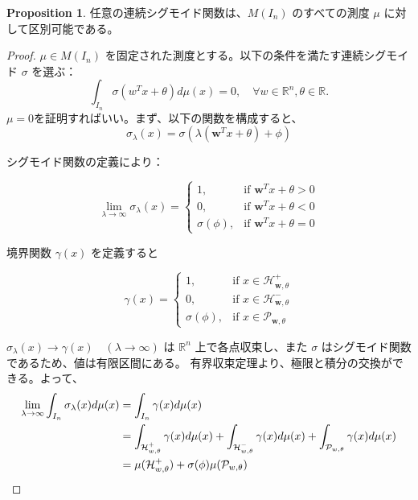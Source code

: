 \documentclass[a4paper]{jsarticle}
\theoremstyle{definition}
\newtheorem{prop}[dfn]{Proposition}
\begin{document}
\begin{prop}
任意の連続シグモイド関数は、$M(I_n)$ のすべての測度 $\mu$ に対して区別可能である。


\begin{proof}
$\mu \in M(I_n)$ を固定された測度とする。以下の条件を満たす連続シグモイド $\sigma$ を選ぶ：
\begin{equation}
  \int_{I_n} \sigma(w^T x + \theta)d\mu(x) = 0, \quad \forall w \in \mathbb{R}^n, \theta \in \mathbb{R}.\label{eq2}
\end{equation}
$\mu=0$を証明すればいい。まず、以下の関数を構成すると、
\[
\sigma_\lambda(x) = \sigma(\lambda(\mathbf{w}^T x + \theta) + \phi)
\]

シグモイド関数の定義により：

\[
\lim_{\lambda \to \infty} \sigma_\lambda(x) = \begin{cases} 
1, & \text{if } \mathbf{w}^T x + \theta > 0 \\
0, & \text{if } \mathbf{w}^T x + \theta < 0 \\
\sigma(\phi), & \text{if } \mathbf{w}^T x + \theta = 0
\end{cases}
\]

境界関数 $\gamma(x)$ を定義すると

\[
\gamma(x) = \begin{cases} 
1, & \text{if } x \in \mathcal{H}^+_{\mathbf{w},\theta} \\
0, & \text{if } x \in \mathcal{H}^-_{\mathbf{w},\theta} \\
\sigma(\phi), & \text{if } x \in \mathcal{P}_{\mathbf{w},\theta}
\end{cases}
\]

$\sigma_\lambda(x) \to \gamma(x)\quad (\lambda\to\infty)$ は $\mathbb{R}^n$ 上で各点収束し、また $\sigma$ はシグモイド関数であるため、値は有限区間にある。
有界収束定理より、極限と積分の交換ができる。よって、
\begin{align}
  \lim_{\lambda \to \infty} \int_{I_n} \sigma_\lambda(x) d\mu(x) &= \int_{I_n} \gamma(x) d\mu(x)\notag\\
  &= \int_{\mathcal{H}^+_{w,\theta}} \gamma(x) d\mu(x) + \int_{\mathcal{H}^-_{w,\theta}} \gamma(x) d\mu(x) + \int_{\mathcal{P}_{w,\theta}} \gamma(x) d\mu(x) \notag\\
  &= \mu(\mathcal{H}^+_{w,\theta}) + \sigma(\phi) \mu(\mathcal{P}_{w,\theta})\notag
\end{align}







\end{proof}
\end{prop}
\end{document}
